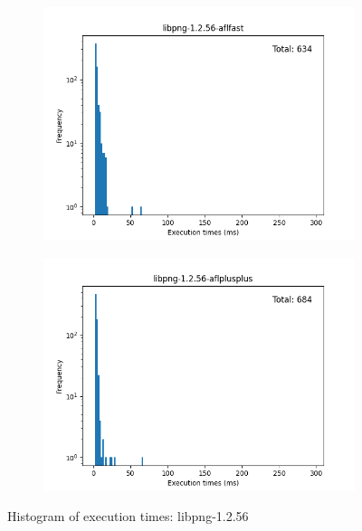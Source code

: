 \begin{figure}
\begin{subfigure}[t]{0.475\textwidth}
        \centering
        \includegraphics[width=\textwidth]{Experiments/execs/libpng-1.2.56-aflfast.png}
        \caption{}
        \label{fig:sub:libpng-hist-aflfast}
    \end{subfigure}
    \hfill
    \begin{subfigure}[t]{0.475\textwidth}
        \centering
        \includegraphics[width=\textwidth]{Experiments/execs/libpng-1.2.56-aflplusplus.png}
        \caption{}
        \label{fig:sub:libpng-hist-aflplusplus}
    \end{subfigure}

    \caption{Histogram of execution times: libpng-1.2.56}
    \label{Figure:exe-libpng}
\end{figure}

